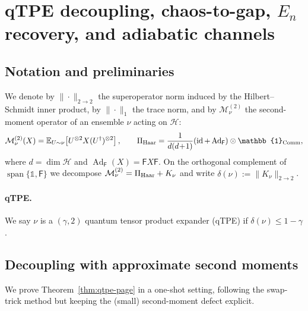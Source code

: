 \providecommand{\Mtwo}{\mathcal{M}^{(2)}}
\providecommand{\FP}{\mathcal{F}}
\section{qTPE decoupling, chaos-to-gap, $E_n$ recovery, and adiabatic channels}\label{app:qtpe}

\subsection{Notation and preliminaries}
We denote by $\|\cdot\|_{2\to 2}$ the superoperator norm induced by the Hilbert--Schmidt inner product, by $\|\cdot\|_1$ the trace norm, and by $\Mtwo_\nu$ the second-moment operator of an ensemble $\nu$ acting on $\mathcal{H}$:
\begin{equation}
\Mtwo_\nu(X)=\mathbb{E}_{U\sim\nu}\!\left[U^{\otimes 2}X(U^\dagger)^{\otimes 2}\right],\qquad
\Pi_{\rm Haar}=\frac{1}{d(d\!+\!1)}\!\left(\operatorname{id}+\operatorname{Ad}_{\mathsf{F}}\right)\otimes\mathbb{1}_{\operatorname{Comm}},
\end{equation}
where $d=\dim\mathcal{H}$ and $\operatorname{Ad}_{\mathsf{F}}(X)=\mathsf{F}X\mathsf{F}$. On the orthogonal complement of $\operatorname{span}\{\mathbb{1},\mathsf{F}\}$ we decompose $\Mtwo_\nu=\Pi_{\rm Haar}+K_\nu$ and write $\delta(\nu):=\|K_\nu\|_{2\to 2}$.

\paragraph{qTPE.} We say $\nu$ is a $(\gamma,2)$ quantum tensor product expander (qTPE) if $\delta(\nu)\le 1-\gamma$.

\subsection{Decoupling with approximate second moments}\label{app:qtpe-decoupling}
We prove Theorem~\ref{thm:qtpe-page} in a one-shot setting, following the swap-trick method but keeping the (small) second-moment defect explicit.

